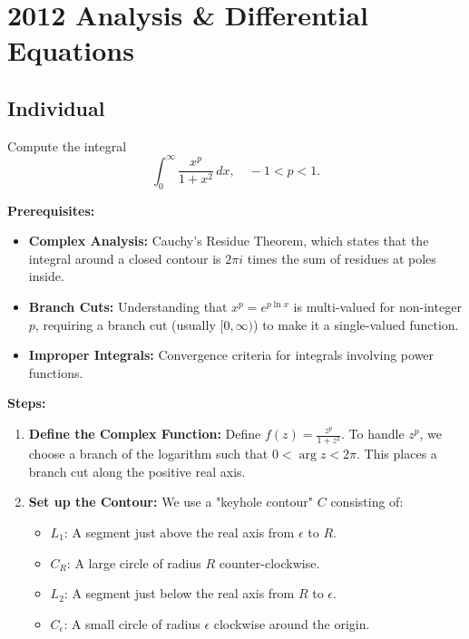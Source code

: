 \section{2012 Analysis \& Differential Equations}

\subsection{Individual}

\begin{exercise}
\label{analysis:2012:1}
Compute the integral
\[
\int_0^{\infty} \frac{x^p}{1+x^2}\,dx, \quad -1<p<1.
\]
\end{exercise}

\begin{solution}
\textbf{Prerequisites:} 
\begin{itemize}
    \item \textbf{Complex Analysis:} Cauchy's Residue Theorem, which states that the integral around a closed contour is $2\pi i$ times the sum of residues at poles inside.
    \item \textbf{Branch Cuts:} Understanding that $x^p = e^{p \ln x}$ is multi-valued for non-integer $p$, requiring a branch cut (usually $[0, \infty)$) to make it a single-valued function.
    \item \textbf{Improper Integrals:} Convergence criteria for integrals involving power functions.
\end{itemize}

\bigskip

\textbf{Steps:}
\begin{enumerate}
    \item \textbf{Define the Complex Function:} Define $f(z) = \frac{z^p}{1+z^2}$. To handle $z^p$, we choose a branch of the logarithm such that $0 < \arg z < 2\pi$. This places a branch cut along the positive real axis.
    
    \item \textbf{Set up the Contour:} We use a "keyhole contour" $C$ consisting of:
    \begin{itemize}
        \item $L_1$: A segment just above the real axis from $\epsilon$ to $R$.
        \item $C_R$: A large circle of radius $R$ counter-clockwise.
        \item $L_2$: A segment just below the real axis from $R$ to $\epsilon$.
        \item $C_\epsilon$: A small circle of radius $\epsilon$ clockwise around the origin.
    \end{itemize}


\end{enumerate}
\end{solution}

